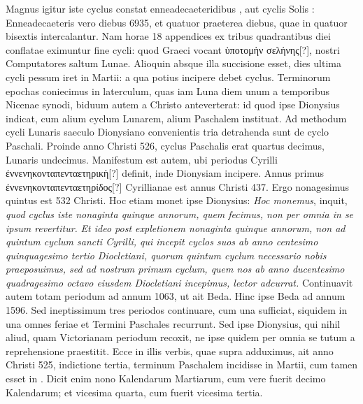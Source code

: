 \begin{table}[tb]
  
\end{table}
%
Magnus igitur
iste cyclus constat enneadecaeteridibus ,
aut cyclis Solis : Enneadecaeteris vero diebus
6935, et quatuor praeterea diebus, quae in
quatuor bisextis intercalantur.
Nam horae 18
appendices ex tribus quadrantibus diei conflatae
eximuntur fine cycli: quod Graeci vocant \textgreek{ὑποτομὴν
σελήνης[?]}, nostri Computatores saltum Lunae.
Alioquin absque illa succisione esset, dies
ultima cycli pessum iret in  Martii: a qua
potius incipere debet cyclus.
Terminorum epochas
coniecimus in laterculum, quas iam Luna
diem unum a temporibus Nicenae synodi, biduum
autem a Christo anteverterat: id quod
ipse Dionysius indicat, cum alium cyclum Lunarem,
alium Paschalem instituat.
Ad methodum cycli Lunaris saeculo Dionysiano convenientis
tria detrahenda sunt de cyclo Paschali.
Proinde anno Christi 526, cyclus Paschalis erat
quartus decimus, Lunaris undecimus.
Manifestum est autem, ubi periodus
 Cyrilli \textgreek{ἐννενηκονταπενταετηρικὴ[?]}
definit, inde Dionysiam incipere.
Annus primus \textgreek{ἐννενηκονταπενταετηρίδος[?]} Cyrillianae est
 annus Christi
437.
Ergo nonagesimus quintus est 532 Christi.
Hoc etiam monet
ipse Dionysius: \textit{Hoc monemus}, inquit, \textit{quod cyclus iste nonaginta
quinque annorum, quem fecimus, non per omnia in se ipsum revertitur.}
\textit{Et ideo post expletionem nonaginta quinque annorum, non ad
quintum cyclum sancti Cyrilli, qui incepit cyclos suos ab anno centesimo
quinquagesimo tertio Diocletiani, quorum quintum cyclum necessario
nobis praeposuimus, sed ad nostrum primum cyclum, quem nos
ab anno ducentesimo quadragesimo octavo eiusdem Diocletiani incepimus,
lector adcurrat.}
Continuavit autem totam periodum
ad annum 1063, ut ait Beda.
Hinc ipse Beda ad annum 1596.
Sed ineptissimum tres periodos continuare, cum una sufficiat, siquidem
in una omnes feriae et Termini Paschales recurrunt.
Sed
ipse Dionysius, qui nihil aliud, quam Victorianam periodum recoxit,
ne ipse quidem per omnia se tutum a reprehensione praestitit.
Ecce in illis verbis, quae supra adduximus,
 ait anno Christi 525, indictione
tertia, terminum Paschalem incidisse in  Martii, cum
tamen esset in .
Dicit enim nono Kalendarum Martiarum, cum
vere fuerit decimo Kalendarum; et vicesima quarta, cum fuerit vicesima
tertia.
